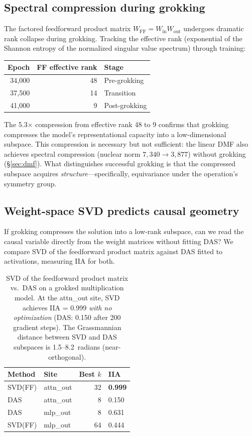 \documentclass{article}
\begin{document}
\subsection{Spectral compression during grokking}
\label{sec:spectral_compression}

The factored feedforward product matrix $W_\text{FF} = W_\text{in} W_\text{out}$
undergoes dramatic rank collapse during grokking. Tracking the effective rank
(exponential of the Shannon entropy of the normalized singular value spectrum)
through training:

\begin{center}
\small
\begin{tabular}{rrl}
\toprule
Epoch & FF effective rank & Stage \\
\midrule
34{,}000 & 48 & Pre-grokking \\
37{,}500 & 14 & Transition \\
41{,}000 & 9 & Post-grokking \\
\bottomrule
\end{tabular}
\end{center}

The 5.3$\times$ compression from effective rank 48 to 9 confirms that
grokking compresses the model's representational capacity into a
low-dimensional subspace. This compression is necessary but not sufficient:
the linear DMF also achieves spectral compression (nuclear norm
$7{,}340 \to 3{,}877$) without grokking (\S\ref{sec:dmf}). What distinguishes
successful grokking is that the compressed subspace acquires
\emph{structure}---specifically, equivariance under the operation's symmetry
group.

\subsection{Weight-space SVD predicts causal geometry}
\label{sec:svd_vs_das}

If grokking compresses the solution into a low-rank subspace, can we read the
causal variable directly from the weight matrices without fitting DAS? We
compare SVD of the feedforward product matrix against DAS fitted to
activations, measuring IIA for both.

\begin{table}[t]
\centering
\small
\begin{tabular}{llrl}
\toprule
Method & Site & Best $k$ & IIA \\
\midrule
SVD(FF) & attn\_out & 32 & \textbf{0.999} \\
DAS     & attn\_out & 8  & 0.150 \\
DAS     & mlp\_out  & 8  & 0.631 \\
SVD(FF) & mlp\_out  & 64 & 0.444 \\
\bottomrule
\end{tabular}
\caption{SVD of the feedforward product matrix vs.\ DAS on a grokked
multiplication model. At the attn\_out site, SVD achieves IIA = 0.999
\emph{with no optimization} (DAS: 0.150 after 200 gradient steps).
The Grassmannian distance between SVD and DAS subspaces is
1.5--8.2~radians (near-orthogonal).}
\label{tab:svd_vs_das}
\end{table}
\end{document}
